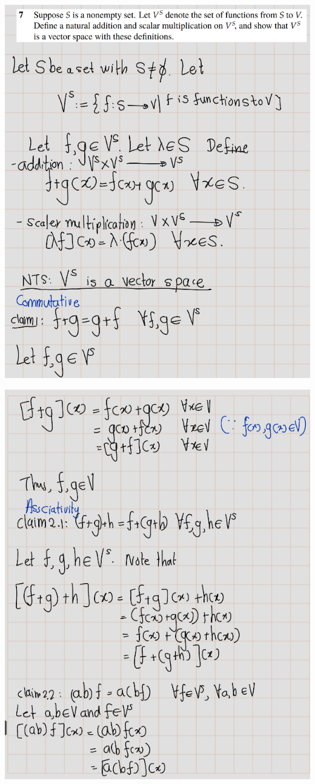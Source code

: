 \documentclass[
]{book}
\theoremstyle{definition}
\theoremstyle{definition}
\theoremstyle{definition}
\theoremstyle{definition}
\theoremstyle{remark}
\begin{document}
\includegraphics{fig/Ex1B/Ex7-1.png}

\includegraphics{fig/Ex1B/Ex7-2.png}
\end{document}
